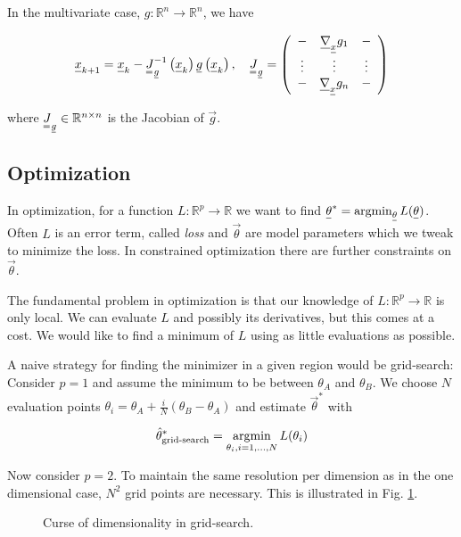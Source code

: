 In the multivariate case, $g: \mathbb{R}^n \rightarrow \mathbb{R}^n$, we have

\begin{equation}
    \vec{x}_{k+1}=\vec{x}_k-\mat{J}_{\vec{g}}^{-1}\left(\vec{x}_k\right) \vec{g}\left(\vec{x}_k\right), \quad \mat{J}_\vec{g}=\left(\begin{array}{ccc}
    - & \vec{\nabla}_{\vec{x}} g_1 & - \\
    \vdots & \vdots & \vdots \\
    - & \vec{\nabla}_{\vec{x}} g_n & -
    \end{array}\right)
\end{equation}

where $\mat{J}_\vec{g} \in \mathbb{R}^{n \times n}$ is the Jacobian of $\vec{g}$.

\subsection{Optimization}

In optimization, for a function $L: \mathbb{R}^p \rightarrow \mathbb{R}$ we want 
to find $\vec{\theta}^* = \argmin_{\vec{\theta}} L(\vec{\theta})$.
Often $L$ is an error term, called \textit{loss} and $\vec{\theta}$ are
model parameters which we tweak to minimize the loss. In constrained optimization
there are further constraints on $\vec{\theta}$.

The fundamental problem in optimization is that our knowledge of 
$L: \mathbb{R}^p \rightarrow \mathbb{R}$ is only
local. We can evaluate $L$ and possibly its derivatives, but this comes at a cost.
We would like to find a minimum of $L$ using as little evaluations as possible.

A naive strategy for finding the minimizer in a given region would be grid-search: Consider
$p = 1$ and assume the minimum to be between $\theta_A$ and $\theta_B$. We choose
$N$ evaluation points $\theta_i = \theta_A + \frac{i}{N} (\theta_B - \theta_A)$
and estimate $\vec{\theta}^*$ with

\begin{equation}
    \hat{\theta}^*_{\text{grid-search}} = \operatorname*{argmin}_{\theta_i, i=1,...,N} L(\theta_i)
\end{equation}

Now consider $p=2$. To maintain the same resolution per dimension as in the one dimensional 
case, $N^2$ grid points are necessary. This is illustrated in Fig. \ref{fig:grid_curse}.

\begin{figure}[!htb]
 \centering
 \hfill
 \caption{Curse of dimensionality in grid-search.}
 \label{fig:grid_curse}
\end{figure}

